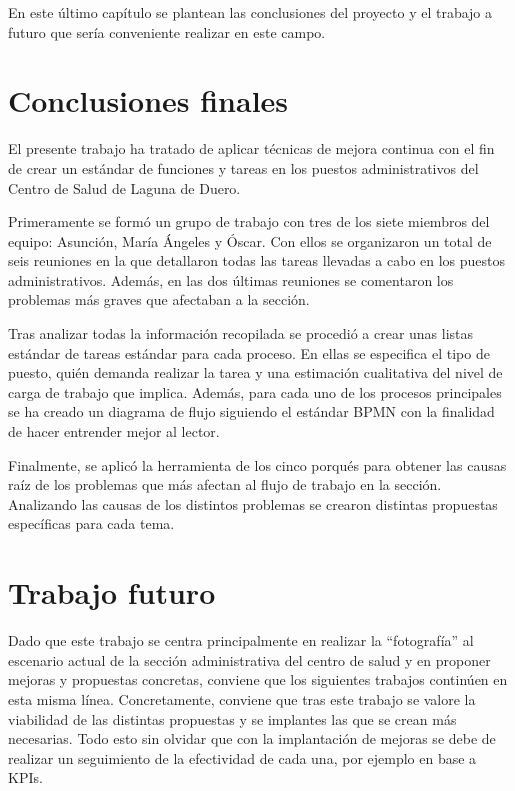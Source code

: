 En este último capítulo se plantean las conclusiones del proyecto y el trabajo a futuro que sería conveniente realizar en este campo.

\section{Conclusiones finales}

El presente trabajo ha tratado de aplicar técnicas de mejora continua con el fin de crear un estándar de funciones y tareas en los puestos administrativos del Centro de Salud de Laguna de Duero.

Primeramente se formó un grupo de trabajo con tres de los siete miembros del equipo: Asunción, María Ángeles y Óscar.
Con ellos se organizaron un total de seis reuniones en la que detallaron todas las tareas llevadas a cabo en los puestos administrativos. Además, en las dos últimas reuniones se comentaron los problemas más graves que afectaban a la sección.

Tras analizar todas la información recopilada se procedió a crear unas listas estándar de tareas estándar para cada proceso.
En ellas se especifica el tipo de puesto, quién demanda realizar la tarea y una estimación cualitativa del nivel de carga de trabajo que implica.
Además, para cada uno de los procesos principales se ha creado un diagrama de flujo siguiendo el estándar BPMN con la finalidad de hacer entrender mejor al lector.

Finalmente, se aplicó la herramienta de los cinco porqués para obtener las causas raíz de los problemas que más afectan al flujo de trabajo en la sección.
Analizando las causas de los distintos problemas se crearon distintas propuestas específicas para cada tema.

\section{Trabajo futuro}

Dado que este trabajo se centra principalmente en realizar la ``fotografía'' al escenario actual de la sección administrativa del centro de salud y en proponer mejoras y propuestas concretas, conviene que los siguientes trabajos continúen en esta misma línea. Concretamente, conviene que tras este trabajo se valore la viabilidad de las distintas propuestas y se implantes las que se crean más necesarias. Todo esto sin olvidar que con la implantación de mejoras se debe de realizar un seguimiento de la efectividad de cada una, por ejemplo en base a KPIs.